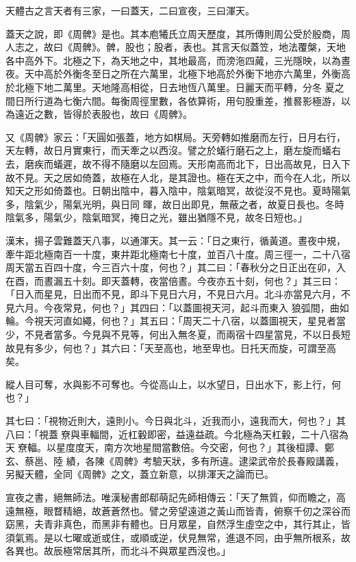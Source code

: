 \begin{pinyinscope}
 天體古之言天者有三家，一曰蓋天，二曰宣夜，三曰渾天。



 蓋天之說，即《周髀》是也。其本庖犧氏立周天歷度，其所傳則周公受於殷商，周人志之，故曰《周髀》。髀，股也；股者，表也。其言天似蓋笠，地法覆槃，天地各中高外下。北極之下，為天地之中，其地最高，而滂沲四蕆，三光隱映，以為晝夜。天中高於外衡冬至日之所在六萬里，北極下地高於外衡下地亦六萬里，外衡高於北極下地二萬里。天地隆高相從，日去地恆八萬里。日麗天而平轉，分冬
 夏之間日所行道為七衡六間。每衡周徑里數，各依算術，用句股重差，推晷影極游，以為遠近之數，皆得於表股也，故曰《周髀》。



 又《周髀》家云：「天圓如張蓋，地方如棋局。天旁轉如推磨而左行，日月右行，天左轉，故日月實東行，而天牽之以西沒。譬之於蟻行磨石之上，磨左旋而蟻右去，磨疾而蟻遲，故不得不隨磨以左回焉。天形南高而北下，日出高故見，日入下故不見。天之居如倚蓋，故極在人北，是其證也。極在天之中，而今在人北，所以知天之形如倚蓋也。日朝出陰中，暮入陰中，陰氣暗冥，故從沒不見也。夏時陽氣多，陰氣少，陽氣光明，與日同
 暉，故日出即見，無蔽之者，故夏日長也。冬時陰氣多，陽氣少，陰氣暗冥，掩日之光，雖出猶隱不見，故冬日短也。」



 漢末，揚子雲難蓋天八事，以通渾天。其一云：「日之東行，循黃道。晝夜中規，牽牛距北極南百一十度，東井距北極南七十度，並百八十度。周三徑一，二十八宿周天當五百四十度，今三百六十度，何也？」其二曰：「春秋分之日正出在卯，入在酉，而晝漏五十刻。即天蓋轉，夜當倍晝。今夜亦五十刻，何也？」其三曰：「日入而星見，日出而不見，即斗下見日六月，不見日六月。北斗亦當見六月，不見六月。今夜常見，何也？」其四曰：「以蓋圖視天河，起斗而東入
 狼弧間，曲如輪。今視天河直如繩，何也？」其五曰：「周天二十八宿，以蓋圖視天，星見者當少，不見者當多。今見與不見等，何出入無冬夏，而兩宿十四星當見，不以日長短故見有多少，何也？」其六曰：「天至高也，地至卑也。日托天而旋，可謂至高矣。



 縱人目可奪，水與影不可奪也。今從高山上，以水望日，日出水下，影上行，何也？」



 其七曰：「視物近則大，遠則小。今日與北斗，近我而小，遠我而大，何也？」其八曰：「視蓋尞與車輻間，近杠轂即密，益遠益疏。今北極為天杠轂，二十八宿為天尞輻。以星度度天，南方次地星間當數倍。今交密，何也？」其後桓譚、鄭玄、蔡邕、陸
 績，各陳《周髀》考驗天狀，多有所違。逮梁武帝於長春殿講義，另擬天體，全同《周髀》之文，蓋立新意，以排渾天之論而已。



 宣夜之書，絕無師法。唯漢秘書郎郗萌記先師相傳云：「天了無質，仰而瞻之，高遠無極，眼瞀精絕，故蒼蒼然也。譬之旁望遠道之黃山而皆青，俯察千仞之深谷而窈黑，夫青非真色，而黑非有體也。日月眾星，自然浮生虛空之中，其行其止，皆須氣焉。是以七曜或逝或住，或順或逆，伏見無常，進退不同，由乎無所根系，故各異也。故辰極常居其所，而北斗不與眾星西沒也。」




\end{pinyinscope}
